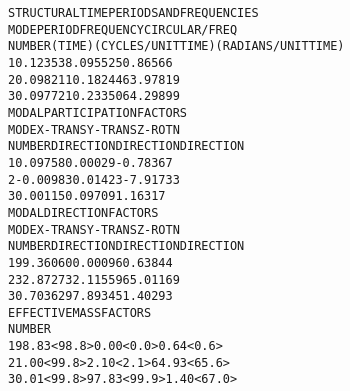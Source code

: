 \documentclass[12pt,notitle,letterpaper]{report}
\renewenvironment{quote}
  {\small\list{}{\rightmargin=0cm \leftmargin=0cm}%
   \item\relax}
  {\endlist}
\begin{document}
\begin{quote}
\begin{alltt}
STRUCTURAL TIME PERIODS AND FREQUENCIES
MODE                   PERIOD           FREQUENCY       CIRCULAR/FREQ
NUMBER                   (TIME)  (CYCLES/UNIT TIME) (RADIANS/UNIT TIME)
     1                  0.12353             8.09552            50.86566
     2                  0.09821            10.18244            63.97819
     3                  0.09772            10.23350            64.29899
MODAL PARTICIPATION FACTORS
MODE                  X-TRANS             Y-TRANS              Z-ROTN
NUMBER                DIRECTION           DIRECTION           DIRECTION
     1                  0.09758             0.00029            -0.78367
     2                 -0.00983             0.01423            -7.91733
     3                  0.00115             0.09709             1.16317
MODAL DIRECTION FACTORS
MODE                  X-TRANS             Y-TRANS              Z-ROTN
NUMBER                DIRECTION           DIRECTION           DIRECTION
     1                 99.36060             0.00096             0.63844
     2                 32.87273             2.11559            65.01169
     3                  0.70362            97.89345             1.40293
EFFECTIVE MASS FACTORS
NUMBER        %-MASS  <%-SUM>     %-MASS  <%-SUM>     %-MASS  <%-SUM>
     1         98.83  < 98.8>       0.00  <  0.0>       0.64  <  0.6>
     2          1.00  < 99.8>       2.10  <  2.1>      64.93  < 65.6>
     3          0.01  < 99.8>      97.83  < 99.9>       1.40  < 67.0>
\end{alltt}
\end{quote}
\end{document}
